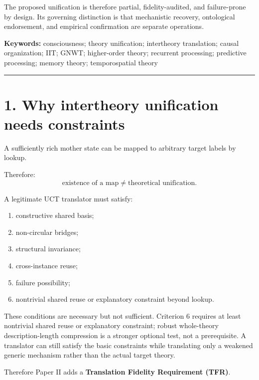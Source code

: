 \documentclass[
  11pt,
  a4paper,
]{article}
\providecommand{\tightlist}{%
  \setlength{\itemsep}{0pt}\setlength{\parskip}{0pt}}
\begin{document}
The proposed unification is therefore partial, fidelity-audited, and
failure-prone by design. Its governing distinction is that mechanistic
recovery, ontological endorsement, and empirical confirmation are
separate operations.

\textbf{Keywords:} consciousness; theory unification; intertheory
translation; causal organization; IIT; GNWT; higher-order theory;
recurrent processing; predictive processing; memory theory;
temporospatial theory

\begin{center}\rule{0.5\linewidth}{0.5pt}\end{center}

\hypertarget{why-intertheory-unification-needs-constraints}{%
\section{1. Why intertheory unification needs
constraints}\label{why-intertheory-unification-needs-constraints}}

A sufficiently rich mother state can be mapped to arbitrary target
labels by lookup.

Therefore:
\nopagebreak[4]
\[
\boxed{
\text{existence of a map}
\neq
\text{theoretical unification}.
}
\]

A legitimate UCT translator must satisfy:

\begin{enumerate}
\def\labelenumi{\arabic{enumi}.}
\tightlist
\item
  constructive shared basis;
\item
  non-circular bridges;
\item
  structural invariance;
\item
  cross-instance reuse;
\item
  failure possibility;
\item
  nontrivial shared reuse or explanatory constraint beyond lookup.
\end{enumerate}

These conditions are necessary but not sufficient. Criterion 6 requires
at least nontrivial shared reuse or explanatory constraint; robust
whole-theory description-length compression is a stronger optional test,
not a prerequisite. A translator can still satisfy the basic constraints
while translating only a weakened generic mechanism rather than the
actual target theory.

Therefore Paper II adds a \textbf{Translation Fidelity Requirement
(TFR)}.
\end{document}
